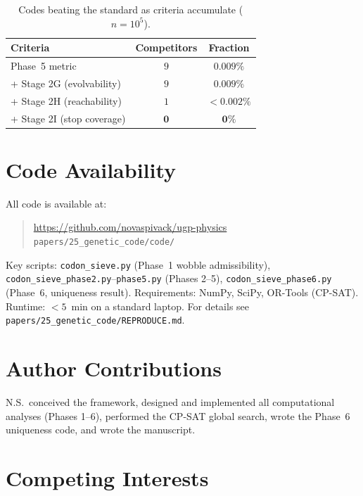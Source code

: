 \documentclass[10pt,twocolumn]{article}
\begin{document}
\begin{table}[h]
\centering\small
\caption{Codes beating the standard as criteria accumulate ($n=10^5$).}
\label{tab:filter_cascade}
\begin{tabular}{@{}lcc@{}}
\toprule
Criteria & Competitors & Fraction \\
\midrule
Phase~5 metric & $9$ & $0.009\%$ \\
+ Stage 2G (evolvability) & $9$ & $0.009\%$ \\
+ Stage 2H (reachability) & $1$ & $<0.002\%$ \\
+ Stage 2I (stop coverage) & $\mathbf{0}$ & $\mathbf{0\%}$ \\
\bottomrule
\end{tabular}
\end{table}

\section*{Code Availability}

All code is available at:
\begin{quote}
\small\raggedright\sloppy
\noindent\url{https://github.com/novaspivack/ugp-physics}\\
\noindent\texttt{papers/25\_genetic\_code/code/}
\end{quote}
Key scripts: \texttt{codon\_sieve.py} (Phase~1 wobble admissibility),
\texttt{codon\_sieve\_phase2.py}--\texttt{phase5.py} (Phases 2--5),
\texttt{codon\_sieve\_phase6.py} (Phase~6, uniqueness result).
Requirements: NumPy, SciPy, OR-Tools (CP-SAT).
Runtime: $<5$~min on a standard laptop.
For details see \texttt{papers/25\_genetic\_code/REPRODUCE.md}.

\section*{Author Contributions}

N.S.\ conceived the framework, designed and implemented all computational
analyses (Phases 1--6), performed the CP-SAT global search, wrote the
Phase~6 uniqueness code, and wrote the manuscript.

\section*{Competing Interests}
\end{document}
